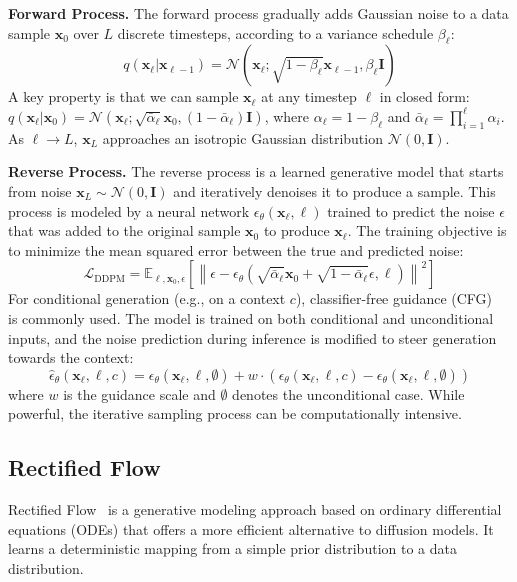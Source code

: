 \documentclass{article} %
\begin{document}
\textbf{Forward Process.} The forward process gradually adds Gaussian noise to a data sample $\mathbf{x}_0$ over $L$ discrete timesteps, according to a variance schedule $\beta_\ell$:
\begin{equation}
    q(\mathbf{x}_\ell | \mathbf{x}_{\ell-1}) = \mathcal{N}(\mathbf{x}_\ell; \sqrt{1 - \beta_\ell} \mathbf{x}_{\ell-1}, \beta_\ell\mathbf{I})
\end{equation}
A key property is that we can sample $\mathbf{x}_\ell$ at any timestep $\ell$ in closed form: $q(\mathbf{x}_\ell | \mathbf{x}_0) = \mathcal{N}(\mathbf{x}_\ell; \sqrt{\bar{\alpha}_\ell} \mathbf{x}_0, (1 - \bar{\alpha}_\ell)\mathbf{I})$, where $\alpha_\ell = 1 - \beta_\ell$ and $\bar{\alpha}_\ell = \prod_{i=1}^\ell \alpha_i$. As $\ell \rightarrow L$, $\mathbf{x}_L$ approaches an isotropic Gaussian distribution $\mathcal{N}(0, \mathbf{I})$.

\textbf{Reverse Process.} The reverse process is a learned generative model that starts from noise $\mathbf{x}_L \sim \mathcal{N}(0, \mathbf{I})$ and iteratively denoises it to produce a sample. This process is modeled by a neural network $\epsilon_\theta(\mathbf{x}_\ell, \ell)$ trained to predict the noise $\epsilon$ that was added to the original sample $\mathbf{x}_0$ to produce $\mathbf{x}_\ell$. The training objective is to minimize the mean squared error between the true and predicted noise:
\begin{equation}
\label{eq:2}
    \mathcal{L}_{\text{DDPM}} = \mathbb{E}_{\ell, \mathbf{x}_0, \epsilon} \left[ \left\| \epsilon - \epsilon_\theta(\sqrt{\bar{\alpha}_\ell}\mathbf{x}_0 + \sqrt{1-\bar{\alpha}_\ell}\epsilon, \ell) \right\|^2 \right]
\end{equation}
For conditional generation (e.g., on a context $c$), classifier-free guidance (CFG)~\citep{ho2022classifier} is commonly used. The model is trained on both conditional and unconditional inputs, and the noise prediction during inference is modified to steer generation towards the context:
\begin{equation}
    \hat{\epsilon}_\theta(\mathbf{x}_\ell, \ell, c) = \epsilon_\theta(\mathbf{x}_\ell, \ell, \emptyset) + w \cdot (\epsilon_\theta(\mathbf{x}_\ell, \ell, c) - \epsilon_\theta(\mathbf{x}_\ell, \ell, \emptyset))
\end{equation}
where $w$ is the guidance scale and $\emptyset$ denotes the unconditional case. While powerful, the iterative sampling process can be computationally intensive.

\subsection{Rectified Flow}
\vspace{-5pt}
Rectified Flow~\citep{lipman2022flow,albergo2023building,liuflow} is a generative modeling approach based on ordinary differential equations (ODEs) that offers a more efficient alternative to diffusion models. It learns a deterministic mapping from a simple prior distribution to a data distribution.
\end{document}
